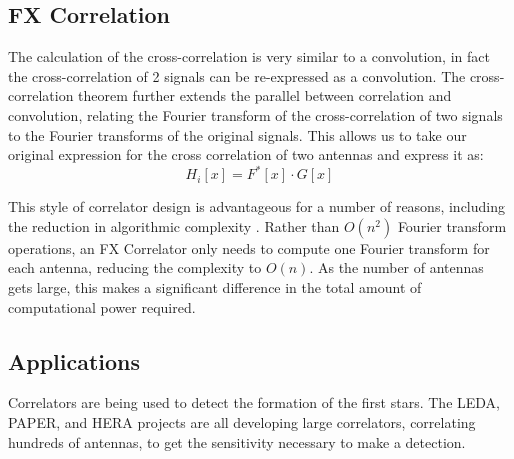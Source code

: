 \subsection{FX Correlation}
The calculation of the cross-correlation is very similar to a convolution, in fact the cross-correlation of 2 signals can be re-expressed as a convolution. 
The cross-correlation theorem further extends the parallel between correlation and convolution, relating the Fourier transform of the cross-correlation of two signals to the Fourier transforms of the original signals. 
This allows us to take our original expression for the cross correlation of two antennas and express it as:
\[H_i[x] = F^*[x] \cdot G[x]\]

This style of correlator design is advantageous for a number of reasons, including the reduction in algorithmic complexity \cite{Bunton:2000tz}.
Rather than $O(n^2)$ Fourier transform operations, an FX Correlator only needs to compute one Fourier transform for each antenna, reducing the complexity to $O(n)$.
As the number of antennas gets large, this makes a significant difference in the total amount of computational power required.

\subsection{Applications}
Correlators are being used to detect the formation of the first stars. 
The LEDA, PAPER, and HERA \cite{Greenhill:2011wm} projects are all developing large correlators, correlating hundreds of antennas, to get the sensitivity necessary to make a detection.

